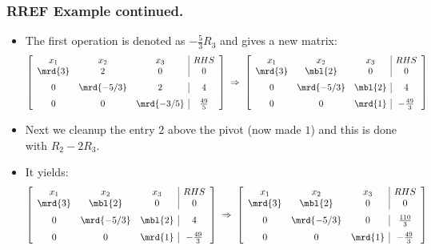 \begin{frame}%
  \frametitle{RREF Example continued.}
  \begin{itemize}%
 
\item  The first operation is denoted as $-\frac{5}{3}R_3$ and gives a new
matrix:
$$\left[ \begin {array}{ccc|c}
x_1 & x_2 & x_3 & RHS\\
\mrd{3}&2&0&0\\\noalign{\medskip}
0&\mrd{-5/3}&2&4\\\noalign{\medskip}
0&0&\mrd{-3/5}&{\frac {49}{5}}\end {array} \right]
~\Rightarrow~
\left[ \begin {array}{ccc|c}
x_1 & x_2 & x_3 & RHS\\
\mrd{3}&\mbl{2}&0&0\\\noalign{\medskip}
0&\mrd{-5/3}&\mbl{2}&4\\\noalign{\medskip}
0&0&\mrd{1}&{-\frac {49}{3}}\end {array} \right]
$$

\item Next we cleanup the entry $2$ above the pivot (now made $1$) and
this is done with $R_2-2R_3$.
\item It yields:
$$
\left[ \begin {array}{ccc|c}
x_1 & x_2 & x_3 & RHS\\
\mrd{3}&\mbl{2}&0&0\\\noalign{\medskip}
0&\mrd{-5/3}&\mbl{2}&4\\\noalign{\medskip}
0&0&\mrd{1}&{-\frac {49}{3}}\end {array} \right]
~\Rightarrow~
\left[ \begin {array}{ccc|c}
x_1 & x_2 & x_3 & RHS\\
\mrd{3}&\mbl{2}&0&0\\\noalign{\medskip}
0&\mrd{-5/3}&0&\frac{110}{3}\\\noalign{\medskip}
0&0&\mrd{1}&{-\frac {49}{3}}\end {array} \right]
$$

\end{itemize}
\end{frame}


